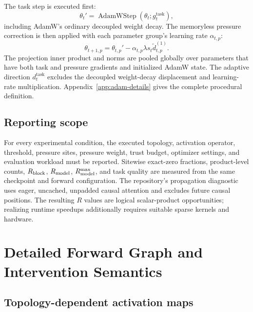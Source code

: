 The task step is executed first:
\begin{equation}
    \theta_t'=\operatorname{AdamWStep}
      \!\left(\theta_t;g_t^{\mathrm{task}}\right),
    \label{eq:task-adamw-step}
\end{equation}
including AdamW's ordinary decoupled weight decay. The memoryless pressure
correction is then applied with each parameter group's learning rate
$\alpha_{t,p}$:
\begin{equation}
    \theta_{t+1,p}
      =\theta_{t,p}'-
       \alpha_{t,p}\lambda s_t\widetilde d_{t,p}^{(1)}.
    \label{eq:post-adam-pressure-step}
\end{equation}
The projection inner product and norms are pooled globally over parameters that
have both task and pressure gradients and initialized AdamW state. The adaptive
direction $d_t^{\mathrm{task}}$ excludes the decoupled weight-decay displacement
and learning-rate multiplication. Appendix~\ref{app:adam-details} gives the
complete procedural definition.

\subsection{Reporting scope}
\label{sec:reporting-scope}

For every experimental condition, the executed topology, activation operator,
threshold, pressure sites, pressure weight, trust budget, optimizer settings,
and evaluation workload must be reported. Sitewise exact-zero fractions,
product-level counts, $R_{\mathrm{block}}$, $R_{\mathrm{model}}$,
$R_{\mathrm{model}}^{\max}$, and task quality are measured from the same checkpoint and
forward configuration. The repository's propagation diagnostic uses eager,
uncached, unpadded causal attention and excludes future causal positions. The
resulting $R$ values are logical scalar-product opportunities; realizing
runtime speedups additionally requires suitable sparse kernels and hardware.

\clearpage
\appendix

\section{Detailed Forward Graph and Intervention Semantics}
\label{app:forward-details}

\subsection{Topology-dependent activation maps}

